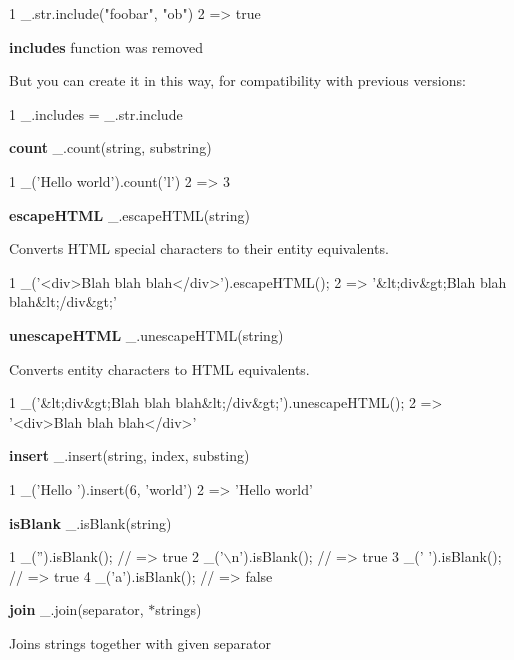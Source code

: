 \begin{DoxyCode}
1 \_.str.include("foobar", "ob")
2 => true
\end{DoxyCode}


{\bfseries includes} function was removed

But you can create it in this way, for compatibility with previous versions\+:


\begin{DoxyCode}
1 \_.includes = \_.str.include
\end{DoxyCode}


{\bfseries count} \+\_\+.\+count(string, substring)


\begin{DoxyCode}
1 \_('Hello world').count('l')
2 => 3
\end{DoxyCode}


{\bfseries escape\+H\+T\+M\+L} \+\_\+.\+escape\+H\+T\+M\+L(string)

Converts H\+T\+M\+L special characters to their entity equivalents.


\begin{DoxyCode}
1 \_('<div>Blah blah blah</div>').escapeHTML();
2 => '&lt;div&gt;Blah blah blah&lt;/div&gt;'
\end{DoxyCode}


{\bfseries unescape\+H\+T\+M\+L} \+\_\+.\+unescape\+H\+T\+M\+L(string)

Converts entity characters to H\+T\+M\+L equivalents.


\begin{DoxyCode}
1 \_('&lt;div&gt;Blah blah blah&lt;/div&gt;').unescapeHTML();
2 => '<div>Blah blah blah</div>'
\end{DoxyCode}


{\bfseries insert} \+\_\+.\+insert(string, index, substing)


\begin{DoxyCode}
1 \_('Hello ').insert(6, 'world')
2 => 'Hello world'
\end{DoxyCode}


{\bfseries is\+Blank} \+\_\+.\+is\+Blank(string)


\begin{DoxyCode}
1 \_('').isBlank(); // => true
2 \_('\(\backslash\)n').isBlank(); // => true
3 \_(' ').isBlank(); // => true
4 \_('a').isBlank(); // => false
\end{DoxyCode}


{\bfseries join} \+\_\+.\+join(separator, $\ast$strings)

Joins strings together with given separator


